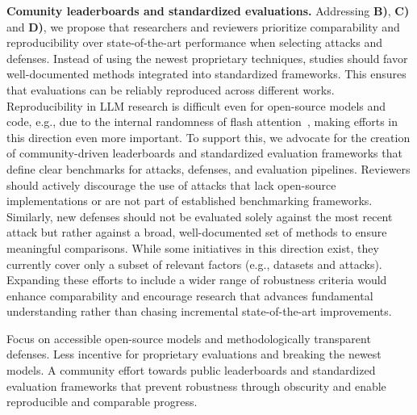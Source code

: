

\textbf{Comunity leaderboards and standardized evaluations.} Addressing \textbf{B)}, \textbf{C)} and \textbf{D)}, we propose that researchers and reviewers prioritize comparability and reproducibility over state-of-the-art performance when selecting attacks and defenses. Instead of using the newest proprietary techniques, studies should favor well-documented methods integrated into standardized frameworks. This ensures that evaluations can be reliably reproduced across different works. Reproducibility in LLM research is difficult even for open-source models and code, e.g., due to the internal randomness of flash attention~\cite{maini2024tofu}, making efforts in this direction even more important. To support this, we advocate for the creation of community-driven leaderboards and standardized evaluation frameworks that define clear benchmarks for attacks, defenses, and evaluation pipelines. Reviewers should actively discourage the use of attacks that lack open-source implementations or are not part of established benchmarking frameworks. Similarly, new defenses should not be evaluated solely against the most recent attack but rather against a broad, well-documented set of methods to ensure meaningful comparisons. While some initiatives in this direction exist, they currently cover only a subset of relevant factors (e.g., datasets and attacks). Expanding these efforts to include a wider range of robustness criteria would enhance comparability and encourage research that advances fundamental understanding rather than chasing incremental state-of-the-art improvements.
\begin{tcolorbox}[
    colback=white, colframe=purple!80!black, coltitle=white, fonttitle=\bfseries, 
    rounded corners, enhanced, 
    title=Key Takeaways, 
    attach boxed title to top left={yshift=-2mm, xshift=5mm}, 
    boxed title style={colback=purple!80!black, rounded corners},
    boxsep=0.5mm,
    left=2mm, %
    right=2mm
]
Focus on accessible open-source models and methodologically transparent defenses. Less incentive for proprietary evaluations and breaking the newest models. A community effort towards public leaderboards and standardized evaluation frameworks that prevent robustness through obscurity and enable reproducible and comparable progress.
\end{tcolorbox}



